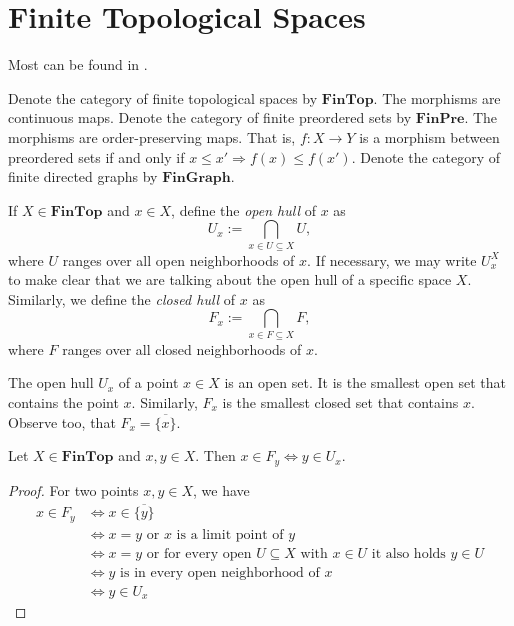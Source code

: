 %
%

\chapter{Finite Topological Spaces}
Most can be found in \cite{barmak11}.
\begin{definition}
	Denote the category of finite topological spaces by $\mathbf{FinTop}$.
	The morphisms are continuous maps.
	Denote the category of finite preordered sets by $\mathbf{FinPre}$.
	The morphisms are order-preserving maps. That is, $f : X \to Y$ is a
	morphism between preordered sets if and only if
	$x \leq x' \Longrightarrow f(x) \leq f(x')$.
	Denote the category of finite directed graphs by $\mathbf{FinGraph}$.
\end{definition}
\begin{definition}
	If $X \in \mathbf{FinTop}$ and $x \in X$, define the \emph{open hull} of
	$x$ as
	\[ U_x := \bigcap_{x \in U \subseteq X} U,\]
	where $U$ ranges over all open neighborhoods of $x$. 
	If necessary, we may write $U_x^X$ to make clear that we are talking about
	the open hull of a specific space $X$. 
	Similarly, we define the \emph{closed hull} of $x$ as
	\[ F_x := \bigcap_{x \in F \subseteq X} F,\]
	where $F$ ranges over all closed neighborhoods of $x$.
\end{definition}
\begin{remark}
	The open hull $U_x$ of a point $x \in X$ is an open set. 
	It is the smallest open set that contains the point $x$. 
	Similarly, $F_x$ is the smallest closed set that contains $x$.
	Observe too, that $F_x = \overline{\{x\}}$.
\end{remark}
\begin{lemma} \label{lem:closed hulls and open hulls}
	Let $X \in \mathbf{FinTop}$ and $x,y \in X$.
	Then $x \in F_y \iff y \in U_x$.
\end{lemma}
\begin{proof}
For two points $x,y \in X$, we have
\begin{align*}
x \in F_y &\iff x \in \overline{\{y\}} \\
&\iff x = y \text{ or } x \text{ is a limit point of } y \\
&\iff x = y \text{ or for every open } U \subseteq X \text{ with } 
	x \in U \text{ it also holds } y \in U \\
&\iff y \text{ is in every open neighborhood of } x \\
&\iff y \in U_x
\end{align*}
\end{proof}

